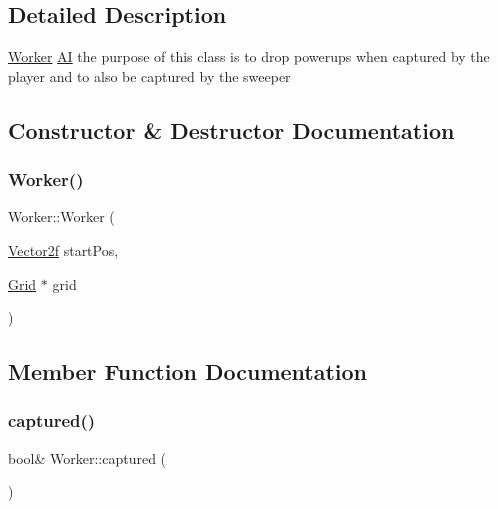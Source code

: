 \subsection{Detailed Description}
\mbox{\hyperlink{class_worker}{Worker}} \mbox{\hyperlink{class_a_i}{AI}} the purpose of this class is to drop powerups when captured by the player and to also be captured by the sweeper 

\subsection{Constructor \& Destructor Documentation}
\mbox{\label{class_worker_a86e97bdd2d5ed06f8a997e8c1f2e4521}} 
\subsubsection{\texorpdfstring{Worker()}{Worker()}}
{\footnotesize\ttfamily Worker\+::\+Worker (\begin{DoxyParamCaption}\item[{\mbox{\hyperlink{class_vector2f}{Vector2f}}}]{start\+Pos,  }\item[{\mbox{\hyperlink{class_grid}{Grid}} $\ast$}]{grid }\end{DoxyParamCaption})}



\subsection{Member Function Documentation}
\mbox{\label{class_worker_ae5d7ebf96509f20ce340a4f22b316687}} 
\subsubsection{\texorpdfstring{captured()}{captured()}}
{\footnotesize\ttfamily bool\& Worker\+::captured (\begin{DoxyParamCaption}{ }\end{DoxyParamCaption})\hspace{0.3cm}{\ttfamily [inline]}}

\mbox{\label{class_worker_af231e1b5014b6c7904c59ed266b5799b}} 
